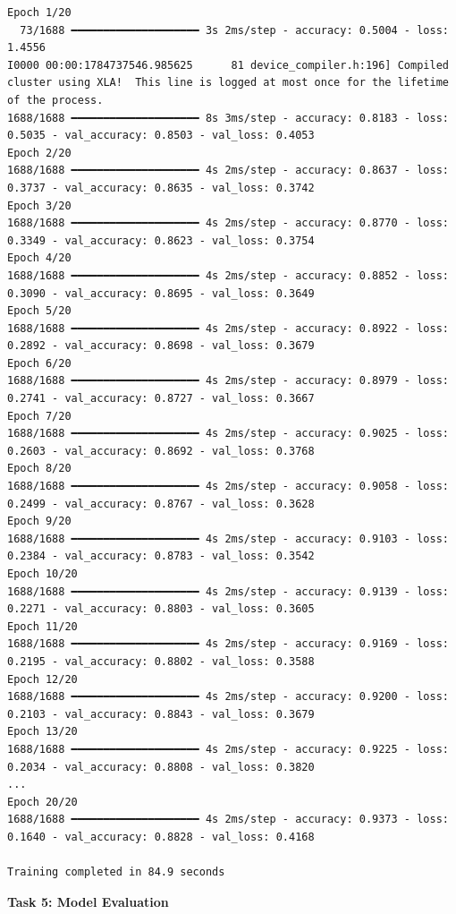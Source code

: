 \documentclass[11pt]{article}
\begin{document}
\begin{lstlisting}[style=output]
Epoch 1/20
  73/1688 ━━━━━━━━━━━━━━━━━━━━ 3s 2ms/step - accuracy: 0.5004 - loss: 1.4556
I0000 00:00:1784737546.985625      81 device_compiler.h:196] Compiled cluster using XLA!  This line is logged at most once for the lifetime of the process.
1688/1688 ━━━━━━━━━━━━━━━━━━━━ 8s 3ms/step - accuracy: 0.8183 - loss: 0.5035 - val_accuracy: 0.8503 - val_loss: 0.4053
Epoch 2/20
1688/1688 ━━━━━━━━━━━━━━━━━━━━ 4s 2ms/step - accuracy: 0.8637 - loss: 0.3737 - val_accuracy: 0.8635 - val_loss: 0.3742
Epoch 3/20
1688/1688 ━━━━━━━━━━━━━━━━━━━━ 4s 2ms/step - accuracy: 0.8770 - loss: 0.3349 - val_accuracy: 0.8623 - val_loss: 0.3754
Epoch 4/20
1688/1688 ━━━━━━━━━━━━━━━━━━━━ 4s 2ms/step - accuracy: 0.8852 - loss: 0.3090 - val_accuracy: 0.8695 - val_loss: 0.3649
Epoch 5/20
1688/1688 ━━━━━━━━━━━━━━━━━━━━ 4s 2ms/step - accuracy: 0.8922 - loss: 0.2892 - val_accuracy: 0.8698 - val_loss: 0.3679
Epoch 6/20
1688/1688 ━━━━━━━━━━━━━━━━━━━━ 4s 2ms/step - accuracy: 0.8979 - loss: 0.2741 - val_accuracy: 0.8727 - val_loss: 0.3667
Epoch 7/20
1688/1688 ━━━━━━━━━━━━━━━━━━━━ 4s 2ms/step - accuracy: 0.9025 - loss: 0.2603 - val_accuracy: 0.8692 - val_loss: 0.3768
Epoch 8/20
1688/1688 ━━━━━━━━━━━━━━━━━━━━ 4s 2ms/step - accuracy: 0.9058 - loss: 0.2499 - val_accuracy: 0.8767 - val_loss: 0.3628
Epoch 9/20
1688/1688 ━━━━━━━━━━━━━━━━━━━━ 4s 2ms/step - accuracy: 0.9103 - loss: 0.2384 - val_accuracy: 0.8783 - val_loss: 0.3542
Epoch 10/20
1688/1688 ━━━━━━━━━━━━━━━━━━━━ 4s 2ms/step - accuracy: 0.9139 - loss: 0.2271 - val_accuracy: 0.8803 - val_loss: 0.3605
Epoch 11/20
1688/1688 ━━━━━━━━━━━━━━━━━━━━ 4s 2ms/step - accuracy: 0.9169 - loss: 0.2195 - val_accuracy: 0.8802 - val_loss: 0.3588
Epoch 12/20
1688/1688 ━━━━━━━━━━━━━━━━━━━━ 4s 2ms/step - accuracy: 0.9200 - loss: 0.2103 - val_accuracy: 0.8843 - val_loss: 0.3679
Epoch 13/20
1688/1688 ━━━━━━━━━━━━━━━━━━━━ 4s 2ms/step - accuracy: 0.9225 - loss: 0.2034 - val_accuracy: 0.8808 - val_loss: 0.3820
...
Epoch 20/20
1688/1688 ━━━━━━━━━━━━━━━━━━━━ 4s 2ms/step - accuracy: 0.9373 - loss: 0.1640 - val_accuracy: 0.8828 - val_loss: 0.4168

Training completed in 84.9 seconds
\end{lstlisting}

\bigskip
\textbf{Task 5: Model Evaluation}
\end{document}
